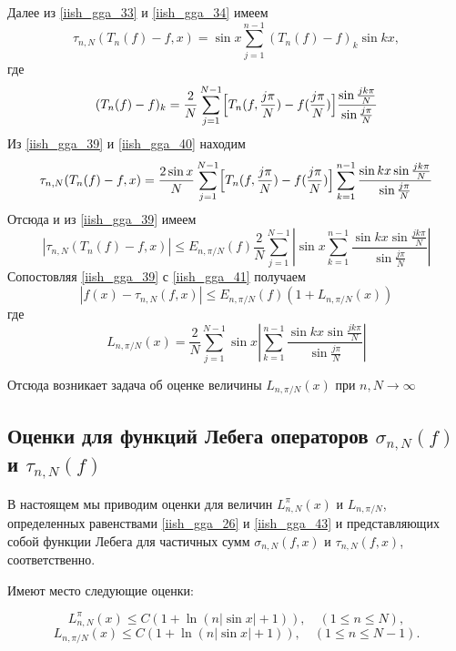 Далее из \eqref{iish_gga_33} и \eqref{iish_gga_34} имеем
\begin{equation}
  \tau_{n,N}(T_n(f) - f, x) = \sin x \sum\limits_{j=1}^{n-1} (T_n(f)-f)_k \sin kx, \label{iish_gga_39}
\end{equation}
где
\begin{equation}
  (T_n(f)-f)_k = \frac2N \sum\limits_{j=1}^{N-1} \Bigl[T_n(f, \frac{j\pi}{N}) - f(\frac{j\pi}{N})\Bigr]\frac{\sin \frac{jk\pi}{N}}{\sin\frac{j\pi}{N}} \label{iish_gga_40}
\end{equation}
Из \eqref{iish_gga_39} и \eqref{iish_gga_40} находим
\begin{equation*}
  \tau_{n,N}(T_n(f)-f, x) = \frac{2 \sin x}{N} \sum\limits_{j=1}^{N-1}\Bigl[T_n(f, \frac{j\pi}{N}) - f(\frac{j\pi}{N})\Bigr]
  \sum\limits_{k=1}^{n-1} \frac{\sin kx \sin \frac{jk\pi}{N}}{\sin \frac{j\pi}{N}}
\end{equation*}
Отсюда и из \eqref{iish_gga_39} имеем
\begin{equation}
  |\tau_{n,N}(T_n(f) - f, x)| \leq E_{n,\pi/N}(f) \frac2N \sum\limits_{j=1}^{N-1}
  \left| \sin x \sum\limits_{k=1}^{n-1} \frac{\sin kx \sin \frac{jk\pi}{N}}{\sin \frac{j\pi}{N}} \right| \label{iish_gga_41}
\end{equation}
Сопостовляя \eqref{iish_gga_39} с \eqref{iish_gga_41} получаем
\begin{equation}
  |f(x) - \tau_{n,N}(f,x)| \leq E_{n,\pi/N}(f)(1+L_{n,\pi/N}(x)) \label{iish_gga_42}
\end{equation}
где
\begin{equation}
  L_{n,\pi/N}(x) = \frac2N \sum\limits_{j=1}^{N-1} \sin x
  \left| \sum\limits_{k=1}^{n-1} \frac{\sin kx \sin \frac{jk\pi}{N}}{\sin \frac{j\pi}{N}} \right| \label{iish_gga_43}
\end{equation}

Отсюда возникает задача об оценке величины $L_{n,\pi/N}(x)$ при $n, N \rightarrow \infty$

\subsection{Оценки для функций Лебега операторов $\sigma_{n,N}(f)$ и $\tau_{n,N}(f)$}
В настоящем мы приводим оценки для величин $L_{n,N}^\pi(x)$ и $L_{n,\pi/N}$, определенных равенствами \eqref{iish_gga_26} и \eqref{iish_gga_43}
и представляющих собой функции Лебега для частичных сумм $\sigma_{n,N}(f,x)$ и $\tau_{n,N}(f,x)$, соответственно.

\begin{theorem}
\label{idshasin.th1}
Имеют место следующие оценки:

\begin{equation}
  L_{n,N}^\pi(x) \leq C(1 + \ln(n| \sin x | + 1)) \label{iish_gga_44}, \quad (1 \leq n \leq N),
\end{equation}
\begin{equation}
  L_{n,\pi/N}(x) \leq C(1 + \ln(n| \sin x | + 1)) \label{iish_gga_45}, \quad (1 \leq n \leq N-1).
\end{equation}
\end{theorem}


